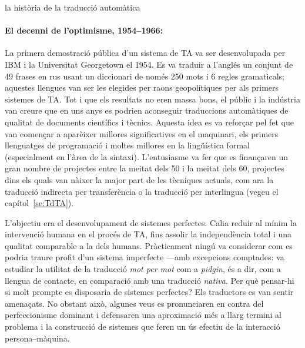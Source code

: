 \begin{persabermes}{la història de la traducció automàtica}
  \paragraph{El decenni de l'optimisme, 1954--1966:}
  La primera demostració pública d'un sistema de TA va ser
  desenvolupada per IBM i la Universitat Georgetown el 1954.  Es va
  traduir a l'anglés un conjunt de 49 frases en rus usant un
  diccionari de només 250 mots i 6 regles gramaticals; aquestes
  llengues van ser les elegides per raons geopolítiques per als
  primers sistemes de TA.  Tot i que els resultats no eren massa bons,
  el públic i la indústria van creure que en uns anys es podrien
  aconseguir traduccions automàtiques de qualitat de documents
  científics i tècnics.  Aquesta idea es va reforçar pel fet que van
  començar a aparèixer millores significatives en el maquinari, els
  primers llenguatges de programació i moltes millores en la
  lingüística formal (especialment en l'àrea de la
  sintaxi). L'entusiasme va fer que es finançaren un gran nombre de
  projectes entre la meitat dels 50 i la meitat dels 60, projectes
  dins els quals van nàixer la major part de les tècniques actuals,
  com ara la traducció indirecta per transferència o la traducció per
  interlingua (vegeu el capítol~\ref{se:TdTA}).

  L'objectiu era el desenvolupament de sistemes perfectes. Calia
  reduir al mínim la intervenció humana en el procés de TA, fins
  assolir la independència total i una qualitat comparable a la dels
  humans. Pràcticament ningú va considerar com es podria traure profit
  d'un sistema imperfecte ---amb excepcions comptades:
  \cite{masterman67b} va estudiar la utilitat de la traducció
  \emph{mot per mot} com a \emph{pidgin}, és a dir, com a llengua de
  contacte, en comparació amb una traducció \emph{nativa}. Per què
  pensar-hi si molt prompte es disposaria de sistemes perfectes? Els
  traductors es van sentir amenaçats. No obstant això, algunes veus es
  pronunciaren en contra del perfeccionisme dominant i defensaren una
  aproximació més a llarg termini al problema i la construcció de
  sistemes que feren un ús efectiu de la interacció persona--màquina.


\end{persabermes}
